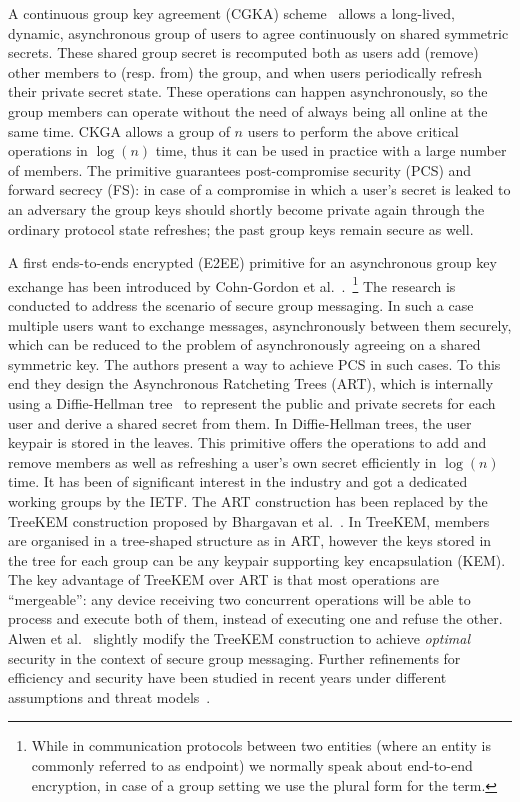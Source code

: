 A continuous group key agreement (CGKA) scheme~\cite{C:ACDT20}
allows a long-lived, dynamic, asynchronous group of users to agree 
continuously on shared symmetric secrets.
These shared group secret is recomputed both as users add (remove)
other members to (resp. from) the group, and when users periodically
refresh their private secret state. These operations can happen
asynchronously, so the group members can operate without the need of always
being all online at the same time.
CKGA allows a group of $n$ users to perform the above critical 
operations in $\log(n)$ time,
thus it can be used in practice with a large number of members.
The primitive guarantees post-compromise security (PCS) and forward secrecy (FS):
in case of a compromise in which a user's secret is leaked
to an adversary the group keys should shortly become private
again through the ordinary protocol state refreshes; the past
group keys remain secure as well.

A first ends-to-ends encrypted (E2EE) primitive for an asynchronous group key exchange 
has been introduced by Cohn-Gordon et al.~\cite{CCS:CCGMM18}.~\footnote{While in communication protocols between two entities (where an entity is commonly referred to as endpoint) we normally speak about end-to-end encryption, in case of a group setting we use the plural form for the term.}
The research is conducted to address the scenario of secure group messaging.
In such a case multiple users want to exchange messages, asynchronously
between them securely, which can be reduced to the problem
of asynchronously agreeing on a shared symmetric key.
The authors present a way to achieve PCS in such cases.
To this end they design the Asynchronous Ratcheting Trees (ART),
which is internally using a Diffie-Hellman tree~\cite{10.1145/1368310.1368347} 
to represent the public and private secrets for each user
and derive a shared secret from them. In Diffie-Hellman
trees, the user keypair is stored in the leaves.
This primitive offers the operations to add and remove members
as well as refreshing a user's own secret efficiently in $\log(n)$ time.
It has been of significant interest in the industry and
got a dedicated working groups by the IETF.
The ART construction has been replaced by the TreeKEM
construction proposed by Bhargavan et al.~\cite{TreeKEM}.
In TreeKEM, members are organised in a tree-shaped structure
as in ART, however the keys stored in the tree for each group
can be any keypair supporting key encapsulation (KEM).
The key advantage of TreeKEM over ART is that
most operations are ``mergeable'':
any device receiving two
concurrent operations will be able to process and execute both of them,
instead of executing one and refuse the other.
Alwen et al.~\cite{C:ACDT20} slightly modify the TreeKEM construction
to achieve \textit{optimal} security in the context of
secure group messaging.
Further refinements for efficiency and security have 
been studied in recent years under different assumptions and threat models~\cite{TCC:ACJM20, SP:KPWKCCMYAP21, CCS:ACDT21, CCS:AHKM22, EC:AANKPPW22, C:AlwJosMul22, C:AlwMulTse23, IWSPA:KEONO23}.

